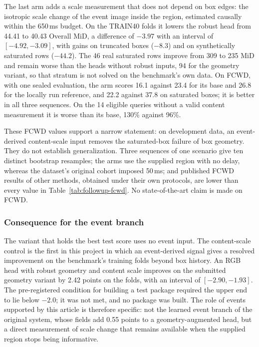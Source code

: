 The last arm adds a scale measurement that does not depend on box edges: the isotropic scale change of the event image inside the region, estimated causally within the 650\,ms budget. On the TRAIN40 folds it lowers the robust head from 44.41 to 40.43 Overall MiD, a difference of $-3.97$ with an interval of $[-4.92,-3.09]$, with gains on truncated boxes ($-8.3$) and on synthetically saturated rows ($-44.2$). The 46 real saturated rows improve from 309 to 235 MiD and remain worse than the heads without robust inputs, 94 for the geometry variant, so that stratum is not solved on the benchmark's own data. On FCWD, with one sealed evaluation, the arm scores 16.1 against 23.4 for its base and 26.8 for the locally run reference, and 22.2 against 37.8 on saturated boxes; it is better in all three sequences. On the 14 eligible queries without a valid content measurement it is worse than its base, 130\% against 96\%.

These FCWD values support a narrow statement: on development data, an event-derived content-scale input removes the saturated-box failure of box geometry. They do not establish generalization. Three sequences of one scenario give ten distinct bootstrap resamples; the arms use the supplied region with no delay, whereas the dataset's original cohort imposed 50\,ms; and published FCWD results of other methods, obtained under their own protocols, are lower than every value in Table~\ref{tab:followup-fcwd}. No state-of-the-art claim is made on FCWD.

\subsubsection{Consequence for the event branch}
\label{sec:followup-events}
The variant that holds the best test score uses no event input. The content-scale control is the first in this project in which an event-derived signal gives a resolved improvement on the benchmark's training folds beyond box history. An RGB head with robust geometry and content scale improves on the submitted geometry variant by 2.42 points on the folds, with an interval of $[-2.90,-1.93]$. The pre-registered condition for building a test package required the upper end to lie below $-2.0$; it was not met, and no package was built. The role of events supported by this article is therefore specific: not the learned event branch of the original system, whose fields add 0.55 points to a geometry-augmented head, but a direct measurement of scale change that remains available when the supplied region stops being informative.

